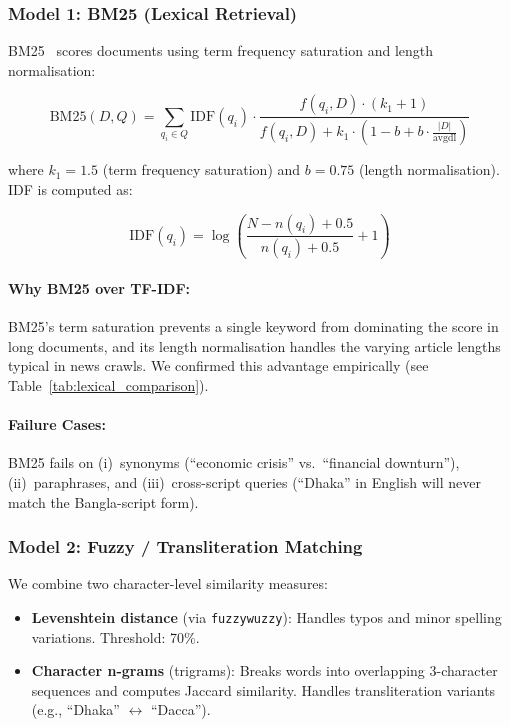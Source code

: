 \documentclass[12pt,a4paper]{article}
\begin{document}
\subsubsection{Model 1: BM25 (Lexical Retrieval)}

BM25~\cite{robertson1995} scores documents using term frequency saturation and length normalisation:

\begin{equation}
\text{BM25}(D,Q) = \sum_{q_i \in Q} \text{IDF}(q_i) \cdot \frac{f(q_i, D) \cdot (k_1 + 1)}{f(q_i, D) + k_1 \cdot \left(1 - b + b \cdot \frac{|D|}{\text{avgdl}}\right)}
\end{equation}

where $k_1 = 1.5$ (term frequency saturation) and $b = 0.75$ (length normalisation). IDF is computed as:

\begin{equation}
\text{IDF}(q_i) = \log\left(\frac{N - n(q_i) + 0.5}{n(q_i) + 0.5} + 1\right)
\end{equation}

\paragraph{Why BM25 over TF-IDF:} BM25's term saturation prevents a single keyword from dominating the score in long documents, and its length normalisation handles the varying article lengths typical in news crawls. We confirmed this advantage empirically (see Table~\ref{tab:lexical_comparison}).

\paragraph{Failure Cases:} BM25 fails on (i)~synonyms (``economic crisis'' vs.\ ``financial downturn''), (ii)~paraphrases, and (iii)~cross-script queries (``Dhaka'' in English will never match the Bangla-script form).

\subsubsection{Model 2: Fuzzy / Transliteration Matching}

We combine two character-level similarity measures:

\begin{itemize}
    \item \textbf{Levenshtein distance} (via \texttt{fuzzywuzzy}): Handles typos and minor spelling variations. Threshold: 70\%.
    \item \textbf{Character n-grams} (trigrams): Breaks words into overlapping 3-character sequences and computes Jaccard similarity. Handles transliteration variants (e.g., ``Dhaka'' $\leftrightarrow$ ``Dacca'').
\end{itemize}
\end{document}
